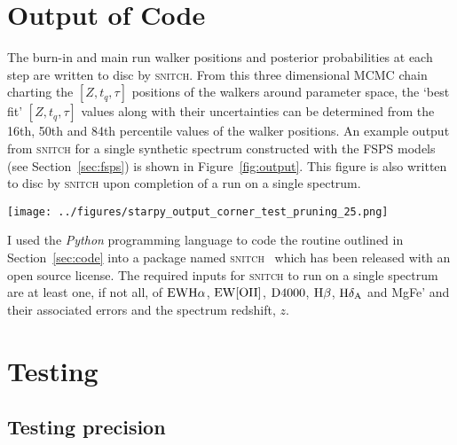 \documentclass[useAMS,usenatbib]{mn2e}
\begin{document}
\section{Output of Code}\label{sec:output}

The burn-in and main run walker positions and posterior probabilities at each step are written to disc by \textsc{snitch}. From this three dimensional MCMC chain charting the $[Z, t_q, \tau]$ positions of the walkers around parameter space, the `best fit' $[Z, t_q, \tau]$ values along with their uncertainties can be determined from the 16th, 50th and 84th percentile values of the walker positions. An example output from \textsc{snitch} for a single synthetic spectrum constructed with the FSPS models (see Section~\ref{sec:fsps}) is shown in Figure~\ref{fig:output}. This figure is also written to disc by \textsc{snitch} upon completion of a run on a single spectrum.  

\begin{figure*}
\centering
\texttt{[image: ../figures/starpy\_output\_corner\_test\_pruning\_25.png]}
\caption{Example output from \textsc{snitch} showing the posterior probability function traced by the MCMC walkers across the three dimensional parameter space $[Z, t_q, \tau]$. Dashed lines show the 18th, 50th and 64th percentile of each distribution function which can be interpreted as the `best fit' with $±1\sigma$. The blue lines show the known true values which \textsc{snitch} has managed to recover.}
\label{fig:output}
\end{figure*}

I used the \emph{Python} programming language to code the routine outlined in Section~\ref{sec:code} into a package named \textsc{snitch} ~which has been released with an open source license. The required inputs for \textsc{snitch} to run on a single spectrum are at least one, if not all, of $\rm{EW}H\alpha$, $\rm{EW}[OII]$, $\rm{D}4000$, $\rm{H}\beta$, $\rm{H}\delta_A$ and MgFe' and their associated errors and the spectrum redshift, $z$. 

\section{Testing}\label{sec:test}

\subsection{Testing precision}\label{sec:precisiontest}
\end{document}
